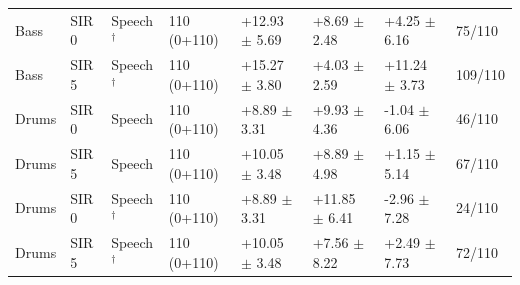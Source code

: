 \begin{tabular}{llllllll}
Bass & SIR 0 & Speech$^\dagger$ & 110 (0+110) & +12.93 $\pm$ 5.69 & +8.69 $\pm$ 2.48 & +4.25 $\pm$ 6.16 & 75/110\\
Bass & SIR 5 & Speech$^\dagger$ & 110 (0+110) & +15.27 $\pm$ 3.80 & +4.03 $\pm$ 2.59 & +11.24 $\pm$ 3.73 & 109/110\\
Drums & SIR 0 & Speech & 110 (0+110) & +8.89 $\pm$ 3.31 & +9.93 $\pm$ 4.36 & -1.04 $\pm$ 6.06 & 46/110\\
Drums & SIR 5 & Speech & 110 (0+110) & +10.05 $\pm$ 3.48 & +8.89 $\pm$ 4.98 & +1.15 $\pm$ 5.14 & 67/110\\
Drums & SIR 0 & Speech$^\dagger$ & 110 (0+110) & +8.89 $\pm$ 3.31 & +11.85 $\pm$ 6.41 & -2.96 $\pm$ 7.28 & 24/110\\
Drums & SIR 5 & Speech$^\dagger$ & 110 (0+110) & +10.05 $\pm$ 3.48 & +7.56 $\pm$ 8.22 & +2.49 $\pm$ 7.73 & 72/110\\
\bottomrule
\end{tabular}
